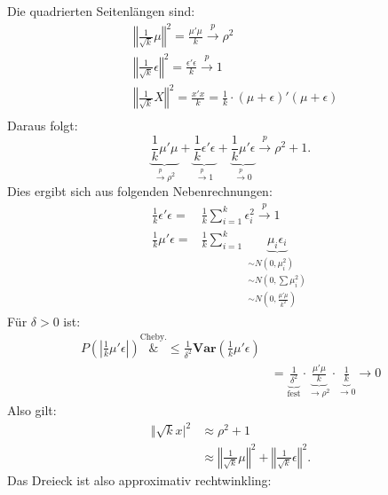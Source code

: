 \documentclass[10pt]{article}
\newcommand{\KW}{\overset{p} \longrightarrow} %
\newcommand{\Var}{\textbf{Var}} %
\begin{document}
	Die quadrierten Seitenlängen sind:
	\begin{equation*}
		\begin{split}
			&\left\Vert \frac{1}{\sqrt{k}} \mu \right\Vert^2 = \frac{\mu'\mu}{k} \KW \rho^2\\
			&\left\Vert \frac{1}{\sqrt{k}}\epsilon \right\Vert^2= \frac{\epsilon'\epsilon}{k}\KW 1\\
			&\left\Vert \frac{1}{\sqrt{k}}X\right\Vert^2= \frac{x'x}{k} = \frac{1}{k} \cdot (\mu + \epsilon)' (\mu+\epsilon) \\
		\end{split}
	\end{equation*}
	Daraus folgt:
	\begin{equation*}
		\underbrace{\frac{1}{k} \mu' \mu}_{\KW \rho^2} + \underbrace{\frac{1}{k} \epsilon'\epsilon}_{\KW 1} + \underbrace{\frac{1}{k} \mu' \epsilon}_{\KW 0} \KW \rho^2 +1.
	\end{equation*}
	Dies ergibt sich aus folgenden Nebenrechnungen:
	\begin{equation*}
		\begin{split}
			\frac{1}{k} \epsilon' \epsilon =& \frac{1}{k} \sum_{i=1}^{k} \epsilon_i^2 \KW 1\\
			\frac{1}{k} \mu' \epsilon =& \frac{1}{k} \sum_{i=1}^{k} \underbrace{\mu_i \epsilon_i}_{\substack{
					\scriptstyle\sim N(0,\mu_i^2) \\ 
					\scriptstyle\sim N(0, \textstyle\sum \mu_i^2) \\ 
					\scriptstyle\sim N(0, \frac{\mu' \mu}{k^2})}}
		\end{split}
	\end{equation*}
	Für $\delta >0$ ist:
	\begin{equation*}
		\begin{split}
			P\left(\left\vert \frac{1}{k} \mu' \epsilon \right\vert \right) \overset{\text{Cheby.}}&{\leq} \frac{1}{\delta^2} \Var\left(\frac{1}{k} \mu' \epsilon \right)\\
			&= \underbrace{\frac{1}{\delta^2}}_{\text{fest}} \cdot \underbrace{\frac{\mu' \mu}{k}}_{\rightarrow \rho^2} \cdot \underbrace{\frac{1}{k}}_{\rightarrow 0} \rightarrow 0
		\end{split}
	\end{equation*}
	Also gilt:
	\begin{equation*}
		\begin{split}
			\Vert \sqrt{k}x\vert^2 &\approx \rho^2+1\\
				&\approx \left\Vert \frac{1}{\sqrt{k}}\mu\right\Vert^2 + \left\Vert \frac{1}{\sqrt{k}} \epsilon \right\Vert^2.
		\end{split}
	\end{equation*}
	Das Dreieck ist also approximativ rechtwinkling: 
	
\end{document}
